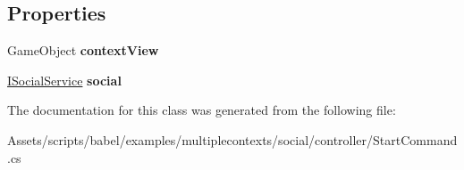 \subsection*{Properties}
\begin{DoxyCompactItemize}
\item 
\hypertarget{classbabel_1_1examples_1_1multiplecontexts_1_1social_1_1_start_command_ae63b3fbdda26f4835f1472f11513a5bc}{Game\-Object {\bfseries context\-View}}\label{classbabel_1_1examples_1_1multiplecontexts_1_1social_1_1_start_command_ae63b3fbdda26f4835f1472f11513a5bc}

\item 
\hypertarget{classbabel_1_1examples_1_1multiplecontexts_1_1social_1_1_start_command_a0751e681f26dfd83b9bd4ea0bfd4f9e2}{\hyperlink{interfacebabel_1_1examples_1_1multiplecontexts_1_1social_1_1_i_social_service}{I\-Social\-Service} {\bfseries social}}\label{classbabel_1_1examples_1_1multiplecontexts_1_1social_1_1_start_command_a0751e681f26dfd83b9bd4ea0bfd4f9e2}

\end{DoxyCompactItemize}


The documentation for this class was generated from the following file\-:\begin{DoxyCompactItemize}
\item 
Assets/scripts/babel/examples/multiplecontexts/social/controller/Start\-Command.\-cs\end{DoxyCompactItemize}
